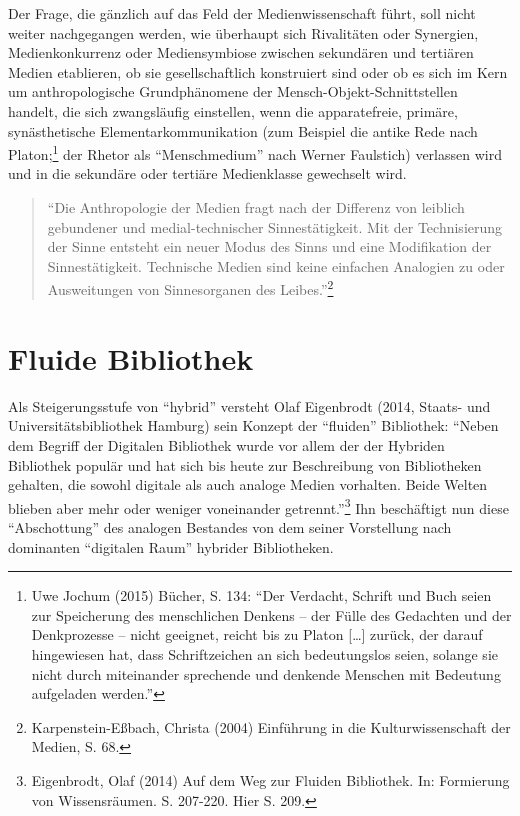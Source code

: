 \documentclass[a4paper,
fontsize=11pt,
oneside,
numbers=noperiodatend,
parskip=half-,
bibliography=totoc,
final
]{scrartcl}
\begin{document}
Der Frage, die gänzlich auf das Feld der Medienwissenschaft führt, soll
nicht weiter nachgegangen werden, wie überhaupt sich Rivalitäten oder
Synergien, Medienkonkurrenz oder Mediensymbiose zwischen sekundären und
tertiären Medien etablieren, ob sie gesellschaftlich konstruiert sind
oder ob es sich im Kern um anthropologische Grundphänomene der
Mensch-Objekt-Schnittstellen handelt, die sich zwangsläufig einstellen,
wenn die apparatefreie, primäre, synästhetische Elementarkommunikation
(zum Beispiel die antike Rede nach Platon;\footnote{Uwe Jochum (2015)
  Bücher, S. 134: \enquote{Der Verdacht, Schrift und Buch seien zur
  Speicherung des menschlichen Denkens -- der Fülle des Gedachten und
  der Denkprozesse -- nicht geeignet, reicht bis zu Platon
  {[}\ldots{}{]} zurück, der darauf hingewiesen hat, dass Schriftzeichen
  an sich bedeutungslos seien, solange sie nicht durch miteinander
  sprechende und denkende Menschen mit Bedeutung aufgeladen werden.}}
der Rhetor als \enquote{Menschmedium} nach Werner Faulstich) verlassen
wird und in die sekundäre oder tertiäre Medienklasse gewechselt wird.

\begin{quote}
\enquote{Die Anthropologie der Medien fragt nach der Differenz von
leiblich gebundener und medial-technischer Sinnestätigkeit. Mit der
Technisierung der Sinne entsteht ein neuer Modus des Sinns und eine
Modifikation der Sinnestätigkeit. Technische Medien sind keine einfachen
Analogien zu oder Ausweitungen von Sinnesorganen des Leibes.}\footnote{Karpenstein-Eßbach,
  Christa (2004) Einführung in die Kulturwissenschaft der Medien, S. 68.}
\end{quote}

\section*{Fluide Bibliothek}\label{fluide-bibliothek}

Als Steigerungsstufe von \enquote{hybrid} versteht Olaf Eigenbrodt
(2014, Staats- und Universitätsbibliothek Hamburg) sein Konzept der
\enquote{fluiden} Bibliothek: \enquote{Neben dem Begriff der Digitalen
Bibliothek wurde vor allem der der Hybriden Bibliothek populär und hat
sich bis heute zur Beschreibung von Bibliotheken gehalten, die sowohl
digitale als auch analoge Medien vorhalten. Beide Welten blieben aber
mehr oder weniger voneinander getrennt.}\footnote{Eigenbrodt, Olaf
  (2014) Auf dem Weg zur Fluiden Bibliothek. In: Formierung von
  Wissensräumen. S. 207-220. Hier S. 209.} Ihn beschäftigt nun diese
\enquote{Abschottung} des analogen Bestandes von dem seiner Vorstellung
nach dominanten \enquote{digitalen Raum} hybrider Bibliotheken.
\end{document}
